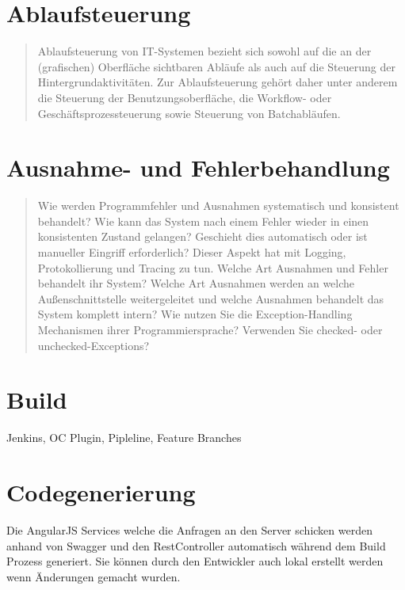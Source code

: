 \section{Ablaufsteuerung}

\begin{quote}
	Ablaufsteuerung von IT-Systemen bezieht sich sowohl auf die an der (grafischen) Oberfläche sichtbaren Abläufe als auch auf die Steuerung der Hintergrundaktivitäten. Zur Ablaufsteuerung gehört daher unter anderem die Steuerung der Benutzungsoberfläche, die Workflow- oder Geschäftsprozessteuerung sowie Steuerung von Batchabläufen.
\end{quote}

\section{Ausnahme- und Fehlerbehandlung}

\begin{quote}
	Wie werden Programmfehler und Ausnahmen systematisch und konsistent behandelt?
	Wie kann das System nach einem Fehler wieder in einen konsistenten Zustand gelangen? Geschieht dies automatisch oder ist manueller Eingriff erforderlich? Dieser Aspekt hat mit Logging, Protokollierung und Tracing zu tun.
	Welche Art Ausnahmen und Fehler behandelt ihr System? Welche Art Ausnahmen werden an welche Außenschnittstelle weitergeleitet und welche Ausnahmen behandelt das System komplett intern? Wie nutzen Sie die Exception-Handling Mechanismen ihrer Programmiersprache? Verwenden Sie checked- oder unchecked-Exceptions?
\end{quote}


\section{Build}

Jenkins, OC Plugin, Pipleline, Feature Branches

\section{Codegenerierung}

Die AngularJS Services welche die Anfragen an den Server schicken werden anhand von Swagger und den RestController automatisch während dem Build Prozess generiert. Sie können durch den Entwickler auch lokal erstellt werden wenn Änderungen gemacht wurden.

